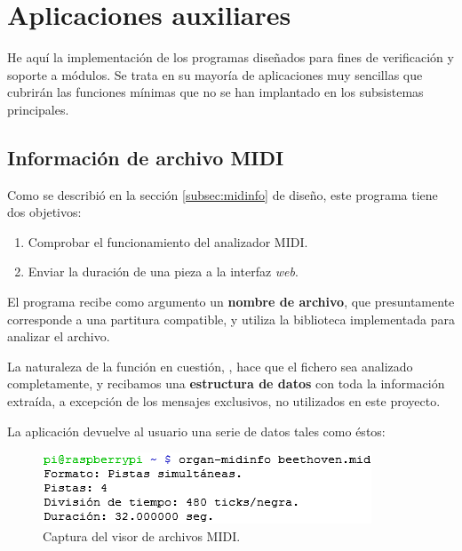 \smallskip

\newpage

\section{Aplicaciones auxiliares}

He aquí la implementación de los programas diseñados para fines de verificación y soporte a módulos. Se trata en su mayoría de aplicaciones muy sencillas que cubrirán las funciones mínimas que no se han implantado en los subsistemas principales.

\subsection{Información de archivo MIDI}

Como se describió en la sección \ref{subsec:midinfo} de diseño, este programa tiene dos objetivos:

\begin{enumerate}
	\item Comprobar el funcionamiento del analizador \acrshort{MIDI}.
	\item Enviar la duración de una pieza a la interfaz \textit{web}.
\end{enumerate}

El programa recibe como argumento un \textbf{nombre de archivo}, que presuntamente corresponde a una partitura compatible, y utiliza la biblioteca implementada para analizar el archivo.

La naturaleza de la función en cuestión, , hace que el fichero sea analizado completamente, y recibamos una \textbf{estructura de datos} con toda la información extraída, a excepción de los mensajes exclusivos, no utilizados en este proyecto.

La aplicación devuelve al usuario una serie de datos tales como éstos:

\smallskip

\begin{figure}[H]
	\noindent \begin{centering}
		\includegraphics[width=\linewidth/2]{capitulo5/cap_midinfo}
		\par\end{centering}
	\smallskip
	\caption{\label{fig:cap_midinfo} Captura del visor de archivos MIDI.}
\end{figure} 

